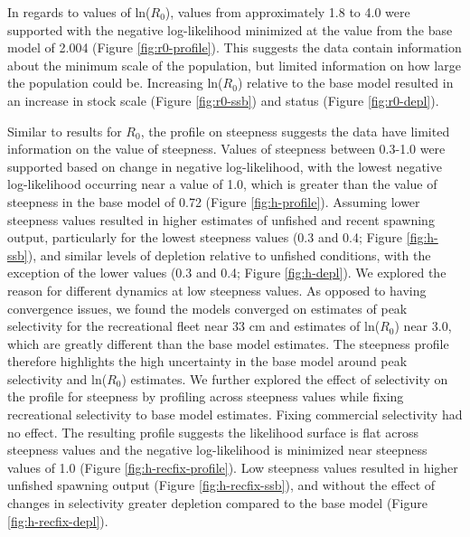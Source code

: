 \documentclass[11pt,
  english,
  letterpaper,
]{article}
\begin{document}
\leavevmode\tagmcend\tagstructend\par


In regards to values of ln({\(R_0\)\leavevmode\tagmcend\tagstructend}), values from approximately 1.8 to 4.0 were supported with the negative log-likelihood minimized at the value from the base model of 2.004 (Figure \ref{fig:r0-profile}). This suggests the data contain information about the minimum scale of the population, but limited information on how large the population could be. Increasing ln({\(R_0\)\leavevmode\tagmcend\tagstructend}) relative to the base model resulted in an increase in stock scale (Figure \ref{fig:r0-ssb}) and status (Figure \ref{fig:r0-depl}).

\leavevmode\tagmcend\tagstructend\par


Similar to results for {\(R_0\)\leavevmode\tagmcend\tagstructend}, the profile on steepness suggests the data have limited information on the value of steepness. Values of steepness between 0.3-1.0 were supported based on change in negative log-likelihood, with the lowest negative log-likelihood occurring near a value of 1.0, which is greater than the value of steepness in the base model of 0.72 (Figure \ref{fig:h-profile}). Assuming lower steepness values resulted in higher estimates of unfished and recent spawning output, particularly for the lowest steepness values (0.3 and 0.4; Figure \ref{fig:h-ssb}), and similar levels of depletion relative to unfished conditions, with the exception of the lower values (0.3 and 0.4; Figure \ref{fig:h-depl}). We explored the reason for different dynamics at low steepness values. As opposed to having convergence issues, we found the models converged on estimates of peak selectivity for the recreational fleet near 33 cm and estimates of ln({\(R_0\)\leavevmode\tagmcend\tagstructend}) near 3.0, which are greatly different than the base model estimates. The steepness profile therefore highlights the high uncertainty in the base model around peak selectivity and ln({\(R_0\)\leavevmode\tagmcend\tagstructend}) estimates. We further explored the effect of selectivity on the profile for steepness by profiling across steepness values while fixing recreational selectivity to base model estimates. Fixing commercial selectivity had no effect. The resulting profile suggests the likelihood surface is flat across steepness values and the negative log-likelihood is minimized near steepness values of 1.0 (Figure \ref{fig:h-recfix-profile}). Low steepness values resulted in higher unfished spawning output (Figure \ref{fig:h-recfix-ssb}), and without the effect of changes in selectivity greater depletion compared to the base model (Figure \ref{fig:h-recfix-depl}).
\end{document}
